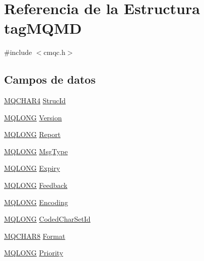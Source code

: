 \hypertarget{structtag_m_q_m_d}{}\section{Referencia de la Estructura tag\+M\+Q\+M\+D}
\label{structtag_m_q_m_d}


{\ttfamily \#include $<$cmqc.\+h$>$}

\subsection*{Campos de datos}
\begin{DoxyCompactItemize}
\item 
\hyperlink{cmqc_8h_a12590e546ed66fda7cf21c1d5cefa31d}{M\+Q\+C\+H\+A\+R4} \hyperlink{structtag_m_q_m_d_a0530922ca944569b52601d74941f96e4}{Struc\+Id}
\item 
\hyperlink{cmqc_8h_a1fb8d28cbda3fa8766a9821230cdb6d5}{M\+Q\+L\+O\+N\+G} \hyperlink{structtag_m_q_m_d_a0656ef8f766b3907d394d88a35d7b7e9}{Version}
\item 
\hyperlink{cmqc_8h_a1fb8d28cbda3fa8766a9821230cdb6d5}{M\+Q\+L\+O\+N\+G} \hyperlink{structtag_m_q_m_d_a3e6ae3e2f087fe6fc26cc75004fbc790}{Report}
\item 
\hyperlink{cmqc_8h_a1fb8d28cbda3fa8766a9821230cdb6d5}{M\+Q\+L\+O\+N\+G} \hyperlink{structtag_m_q_m_d_a22732037d5385ab03eb3e9d9a5e60843}{Msg\+Type}
\item 
\hyperlink{cmqc_8h_a1fb8d28cbda3fa8766a9821230cdb6d5}{M\+Q\+L\+O\+N\+G} \hyperlink{structtag_m_q_m_d_a85cb54f2f2a97fe071fcad54d22a92a9}{Expiry}
\item 
\hyperlink{cmqc_8h_a1fb8d28cbda3fa8766a9821230cdb6d5}{M\+Q\+L\+O\+N\+G} \hyperlink{structtag_m_q_m_d_a9cb2f407eb097aa9cdc246dc18059987}{Feedback}
\item 
\hyperlink{cmqc_8h_a1fb8d28cbda3fa8766a9821230cdb6d5}{M\+Q\+L\+O\+N\+G} \hyperlink{structtag_m_q_m_d_a30167bf454a49a60fd3fe4e9e586af34}{Encoding}
\item 
\hyperlink{cmqc_8h_a1fb8d28cbda3fa8766a9821230cdb6d5}{M\+Q\+L\+O\+N\+G} \hyperlink{structtag_m_q_m_d_a4d8d1961a991850d1355cdf9b4680b8e}{Coded\+Char\+Set\+Id}
\item 
\hyperlink{cmqc_8h_abddcedb8c41fa262f2bd05dfec3e60a5}{M\+Q\+C\+H\+A\+R8} \hyperlink{structtag_m_q_m_d_a435a478822008713f8aaff89f369ed63}{Format}
\item 
\hyperlink{cmqc_8h_a1fb8d28cbda3fa8766a9821230cdb6d5}{M\+Q\+L\+O\+N\+G} \hyperlink{structtag_m_q_m_d_a72c542b9e2952a489df0cb84755c1fa6}{Priority}

\end{DoxyCompactItemize}
